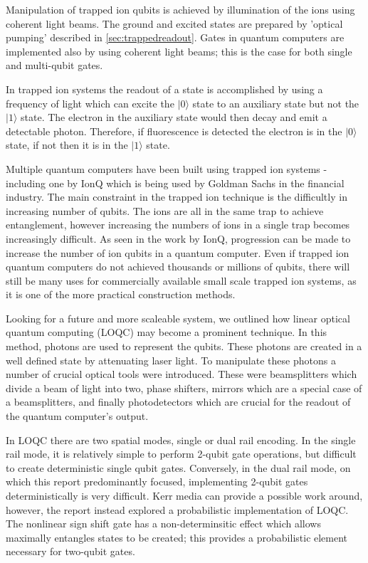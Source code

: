 Manipulation of trapped ion qubits is achieved by illumination of the ions using coherent light beams.
The ground and excited states are prepared by 'optical pumping' described in \cref{sec:trappedreadout}.
Gates in quantum computers are implemented also by using coherent light beams; this is the case for both single and multi-qubit gates.

In trapped ion systems the readout of a state is accomplished by using a frequency of light which can excite the $|0\rangle$ state to an auxiliary state but not the $|1\rangle$ state. The electron in the auxiliary state would then decay and emit a detectable photon. Therefore, if fluorescence is detected the electron is in the $|0\rangle $ state, if not then it is in the $|1\rangle$ state. 

Multiple quantum computers have been built using trapped ion systems - including one by IonQ which is being used by Goldman Sachs in the financial industry. \cite{noauthor_goldman_2021} 
The main constraint in the trapped ion technique is the difficultly in increasing number of qubits. The ions are all in the same trap to achieve entanglement, however increasing the numbers of ions in a single trap becomes increasingly difficult. As seen in the work by IonQ, progression can be made to increase the number of ion qubits in a quantum computer. Even if trapped ion quantum computers do not achieved thousands or millions of qubits, there will still be many uses for commercially available small scale trapped ion systems, as it is one of the more practical construction methods.

Looking for a future and more scaleable system, we outlined how linear optical quantum computing (LOQC) may become a prominent technique. In this method, photons are used to represent the qubits. These photons are created in a well defined state by attenuating laser light. To manipulate these photons a number of crucial optical tools were introduced. These were beamsplitters which divide a beam of light into two, phase shifters, mirrors which are a special case of a beamsplitters, and finally photodetectors which are crucial for the readout of the quantum computer's output.

In LOQC there are two spatial modes, single or dual rail encoding. In the single rail mode, it is relatively simple to perform 2-qubit gate operations, but difficult to create deterministic single qubit gates. Conversely, in the dual rail mode, on which this report predominantly focused, implementing 2-qubit gates deterministically is very difficult. Kerr media can provide a possible work around, however, the report instead explored a probabilistic implementation of LOQC. The nonlinear sign shift gate has a non-determinsitic effect which allows maximally entangles states to be created; this provides a probabilistic element necessary for two-qubit gates.

